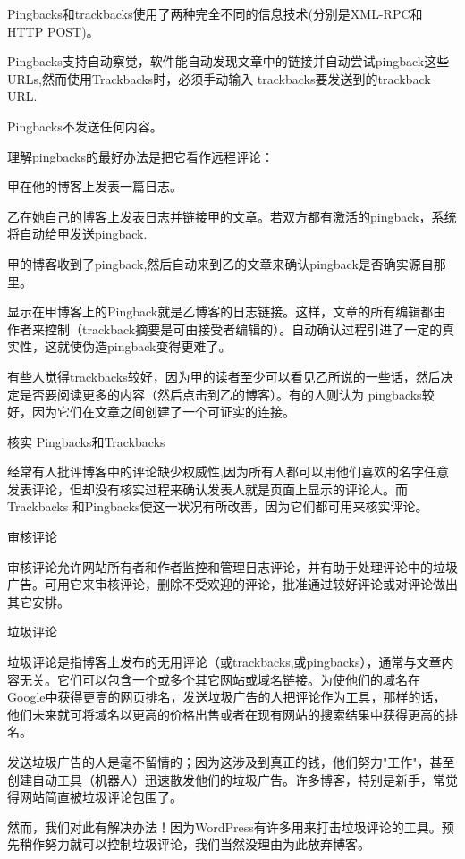 \begin{compactenum}
\begin{compactitem}
\item Pingbacks和trackbacks使用了两种完全不同的信息技术(分别是XML-RPC和HTTP POST)。
\item Pingbacks支持自动察觉，软件能自动发现文章中的链接并自动尝试pingback这些URLs,然而使用Trackbacks时，必须手动输入 trackbacks要发送到的trackback URL.
\item Pingbacks不发送任何内容。
\end{compactitem}

理解pingbacks的最好办法是把它看作远程评论：

\begin{compactitem}
\item 甲在他的博客上发表一篇日志。
\item 乙在她自己的博客上发表日志并链接甲的文章。若双方都有激活的pingback，系统将自动给甲发送pingback.
\item 甲的博客收到了pingback,然后自动来到乙的文章来确认pingback是否确实源自那里。
\end{compactitem}

显示在甲博客上的Pingback就是乙博客的日志链接。这样，文章的所有编辑都由作者来控制（trackback摘要是可由接受者编辑的）。自动确认过程引进了一定的真实性，这就使伪造pingback变得更难了。

有些人觉得trackbacks较好，因为甲的读者至少可以看见乙所说的一些话，然后决定是否要阅读更多的内容（然后点击到乙的博客）。有的人则认为 pingbacks较好，因为它们在文章之间创建了一个可证实的连接。

\item 核实 Pingbacks和Trackbacks

经常有人批评博客中的评论缺少权威性,因为所有人都可以用他们喜欢的名字任意发表评论，但却没有核实过程来确认发表人就是页面上显示的评论人。而Trackbacks 和Pingbacks使这一状况有所改善，因为它们都可用来核实评论。

\item 审核评论

审核评论允许网站所有者和作者监控和管理日志评论，并有助于处理评论中的垃圾广告。可用它来审核评论，删除不受欢迎的评论，批准通过较好评论或对评论做出其它安排。

\item 垃圾评论

垃圾评论是指博客上发布的无用评论（或trackbacks,或pingbacks），通常与文章内容无关。它们可以包含一个或多个其它网站或域名链接。为使他们的域名在Google中获得更高的网页排名，发送垃圾广告的人把评论作为工具，那样的话，他们未来就可将域名以更高的价格出售或者在现有网站的搜索结果中获得更高的排名。

发送垃圾广告的人是毫不留情的；因为这涉及到真正的钱，他们努力"工作"，甚至创建自动工具（机器人）迅速散发他们的垃圾广告。许多博客，特别是新手，常觉得网站简直被垃圾评论包围了。

然而，我们对此有解决办法！因为WordPress有许多用来打击垃圾评论的工具。预先稍作努力就可以控制垃圾评论，我们当然没理由为此放弃博客。


\end{compactenum}

